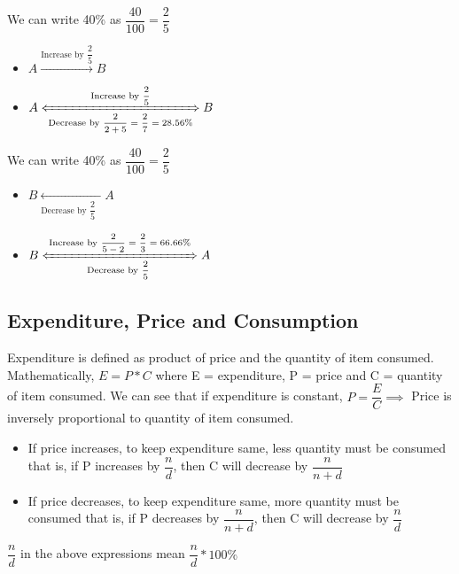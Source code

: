 We can write 40\%  as $\dfrac{40}{100} = \dfrac{2}{5}$

\begin{itemize}
    \item $A \xrightarrow{\text{Increase by $\dfrac{2}{5}$}} B$
    \item $A \xLeftrightarrow[\text{Decrease by $\dfrac{2}{2+5} = \dfrac{2}{7} = 28.56\% $}]{\text{Increase by $\dfrac{2}{5}$}} B$
\end{itemize}


We can write 40\% as $\dfrac{40}{100} = \dfrac{2}{5}$

\begin{itemize}
    \item $B \xleftarrow[\text{Decrease by $\dfrac{2}{5}$ } ]{} A$
    \item $B \xLeftrightarrow[\text{Decrease by $\dfrac{2}{5}$ } ]{\text{Increase by $\dfrac{2}{5 - 2} = \dfrac{2}{3} = 66.66\%$}} A $
\end{itemize}

\subsection{Expenditure, Price and Consumption}
Expenditure is defined as product of price and the quantity of item consumed. Mathematically, $E = P * C$ where E = expenditure, P = price and C = quantity of item consumed. We can see that if expenditure is constant, $P = \dfrac{E}{C} \implies $ Price is inversely proportional to quantity of item consumed.

\begin{itemize}
    \item If price increases, to keep expenditure same, less quantity must be consumed that is, if P increases by $\dfrac{n}{d}$, then C will decrease by $\dfrac{n}{n + d}$
    
    \item If price decreases, to keep expenditure same, more quantity must be consumed that is, if P decreases by $\dfrac{n}{n + d}$, then C will decrease by $\dfrac{n}{d}$
\end{itemize}

\begin{NOTE}
    $\dfrac{n}{d}$ in the above expressions mean $\dfrac{n}{d} * 100 \%$
\end{NOTE}

